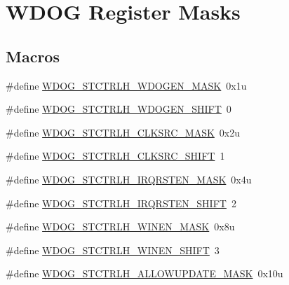 \hypertarget{group___w_d_o_g___register___masks}{}\section{W\+D\+OG Register Masks}
\label{group___w_d_o_g___register___masks}
\subsection*{Macros}
\begin{DoxyCompactItemize}
\item 
\#define \hyperlink{group___w_d_o_g___register___masks_ga4ca33884d6a6fed2670ba04150fbff3a}{W\+D\+O\+G\+\_\+\+S\+T\+C\+T\+R\+L\+H\+\_\+\+W\+D\+O\+G\+E\+N\+\_\+\+M\+A\+SK}~0x1u
\item 
\#define \hyperlink{group___w_d_o_g___register___masks_ga7d9c369fd8fe12905d3e4b2d94bfe9be}{W\+D\+O\+G\+\_\+\+S\+T\+C\+T\+R\+L\+H\+\_\+\+W\+D\+O\+G\+E\+N\+\_\+\+S\+H\+I\+FT}~0
\item 
\#define \hyperlink{group___w_d_o_g___register___masks_gaf3ab71b185905c077887baa062ad6664}{W\+D\+O\+G\+\_\+\+S\+T\+C\+T\+R\+L\+H\+\_\+\+C\+L\+K\+S\+R\+C\+\_\+\+M\+A\+SK}~0x2u
\item 
\#define \hyperlink{group___w_d_o_g___register___masks_gaa437494e2c4bb2952986b89d4a52f2bf}{W\+D\+O\+G\+\_\+\+S\+T\+C\+T\+R\+L\+H\+\_\+\+C\+L\+K\+S\+R\+C\+\_\+\+S\+H\+I\+FT}~1
\item 
\#define \hyperlink{group___w_d_o_g___register___masks_ga64ebb40c66318cac7631c3fd467c846a}{W\+D\+O\+G\+\_\+\+S\+T\+C\+T\+R\+L\+H\+\_\+\+I\+R\+Q\+R\+S\+T\+E\+N\+\_\+\+M\+A\+SK}~0x4u
\item 
\#define \hyperlink{group___w_d_o_g___register___masks_ga0b519bf4ae17a11b51878819d4249e00}{W\+D\+O\+G\+\_\+\+S\+T\+C\+T\+R\+L\+H\+\_\+\+I\+R\+Q\+R\+S\+T\+E\+N\+\_\+\+S\+H\+I\+FT}~2
\item 
\#define \hyperlink{group___w_d_o_g___register___masks_ga74edc83d2a673f012aeff6410a8be861}{W\+D\+O\+G\+\_\+\+S\+T\+C\+T\+R\+L\+H\+\_\+\+W\+I\+N\+E\+N\+\_\+\+M\+A\+SK}~0x8u
\item 
\#define \hyperlink{group___w_d_o_g___register___masks_gae0770ee0a74441bd3d2e0d3c291ca4b6}{W\+D\+O\+G\+\_\+\+S\+T\+C\+T\+R\+L\+H\+\_\+\+W\+I\+N\+E\+N\+\_\+\+S\+H\+I\+FT}~3
\item 
\#define \hyperlink{group___w_d_o_g___register___masks_gaf524a1ad1f811741b27f29836d6137ee}{W\+D\+O\+G\+\_\+\+S\+T\+C\+T\+R\+L\+H\+\_\+\+A\+L\+L\+O\+W\+U\+P\+D\+A\+T\+E\+\_\+\+M\+A\+SK}~0x10u

\end{DoxyCompactItemize}
